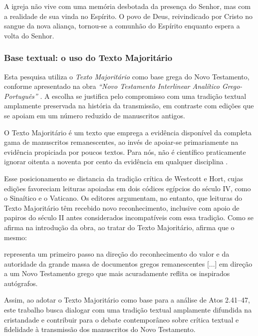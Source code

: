 \begin{citacao}
    A igreja não vive com uma memória desbotada da presença do Senhor, mas com a realidade de sua vinda no Espírito. O povo de Deus, reivindicado por Cristo no sangue da nova aliança, tornou-se a comunhão do Espírito enquanto espera a volta do Senhor. \cite[p.~46]{clowney2007}
\end{citacao}

\subsubsection{Base textual: o uso do Texto Majoritário}

Esta pesquisa utiliza o \textit{Texto Majoritário} como base grega do Novo Testamento, conforme apresentado na obra \textit{``Novo Testamento Interlinear Analítico Grego-Português''} \cite{interlinear2008}. A escolha se justifica pelo compromisso com uma tradição textual amplamente preservada na história da transmissão, em contraste com edições que se apoiam em um número reduzido de manuscritos antigos.

\begin{citacao}
    O Texto Majoritário é um texto que emprega a evidência disponível da completa gama de manuscritos remanescentes, ao invés de apoiar-se primariamente na evidência propiciada por poucos textos. Para nós, não é científico praticamente ignorar oitenta a noventa por cento da evidência em qualquer disciplina \cite[p.~ix]{interlinear2008}.
\end{citacao}

Esse posicionamento se distancia da tradição crítica de Westcott e Hort, cujas edições favoreciam leituras apoiadas em dois códices egípcios do século IV, como o Sinaítico e o Vaticano. Os editores  argumentam, no entanto, que leituras do Texto Majoritário têm recebido novo reconhecimento, inclusive com apoio de papiros do século II antes considerados incompatíveis com essa tradição. Como se afirma na introdução da obra, ao tratar do Texto Majoritário, afirma que o mesmo:

\begin{citacao}
    representa um primeiro passo na direção do reconhecimento do valor e da autoridade da grande massa de documentos gregos remanescentes [...] em direção a um Novo Testamento grego que mais acuradamente reflita os inspirados autógrafos. \cite[p.~xiii]{interlinear2008}
\end{citacao}

Assim, ao adotar o Texto Majoritário como base para a análise de Atos 2.41–47, este trabalho busca dialogar com uma tradição textual amplamente difundida na cristandade e contribuir para o debate contemporâneo sobre crítica textual e fidelidade à transmissão dos manuscritos do Novo Testamento.

